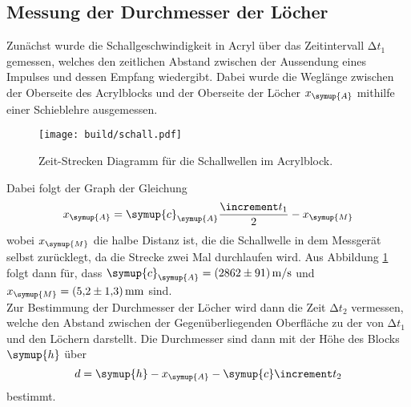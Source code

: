 \subsection{Messung der Durchmesser der Löcher}

Zunächst wurde die Schallgeschwindigkeit in Acryl über das Zeitintervall $\increment t_1$ gemessen, welches den zeitlichen
Abstand zwischen der Aussendung eines Impulses und dessen Empfang wiedergibt. Dabei wurde die Weglänge zwischen der 
Oberseite des Acrylblocks und der Oberseite der Löcher $x_{\symup{A}}$ mithilfe einer Schieblehre ausgemessen.
\begin{figure}[H]
    \texttt{[image: build/schall.pdf]}
    \centering
    \caption{Zeit-Strecken Diagramm für die Schallwellen im Acrylblock.}
    \label{fig:schall}
\end{figure}
\noindent Dabei folgt der Graph der Gleichung
\begin{equation}
    x_{\symup{A}}=\symup{c}_{\symup{A}} \frac{\increment t_1}{2}-x_{\symup{M}}
    \label{eqn:gerade}
\end{equation}
wobei $x_{\symup{M}}$ die halbe Distanz ist, die die Schallwelle in dem Messgerät selbst zurücklegt, da die Strecke zwei
Mal durchlaufen wird.
Aus Abbildung \ref{fig:schall} folgt dann für, dass $\symup{c}_{\symup{A}}=\qty{2862(91)}{\meter\per\second}$ und
$x_{\symup{M}}=\qty{5.2(1.3)}{\milli\meter}$ sind.\\
Zur Bestimmung der Durchmesser der Löcher wird dann die Zeit $\increment t_2$ vermessen, welche den Abstand zwischen
der Gegenüberliegenden Oberfläche zu der von $\increment t_1$ und den Löchern darstellt.
Die Durchmesser sind dann mit der Höhe des Blocks $\symup{h}$ über
\begin{equation}
    d=\symup{h}-x_{\symup{A}}-\symup{c} \increment t_2
    \label{eqn:durchmesser}
\end{equation}
bestimmt.
